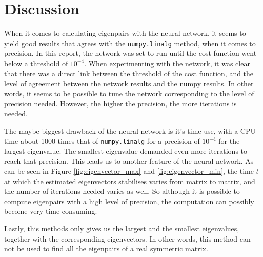 \section{Discussion}
\label{sec:discussion}

When it comes to calculating eigenpairs with the neural network, it seems to yield good results that agrees with the \texttt{numpy.linalg} method, when it comes to precision. In this report, the network was set to run until the cost function went below a threshold of $10^{-4}$. When experimenting with the network, it was clear that there was a direct link between the threshold of the cost function, and the level of agreement between the network results and the numpy results. In other words, it seems to be possible to tune the network corresponding to the level of precision needed. However, the higher the precision, the more iterations is needed. 

The maybe biggest drawback of the neural network is it's time use, with a CPU time about 1000 times that of \texttt{numpy.linalg} for a precision of $10^{-4}$ for the largest eigenvalue. The smallest eigenvalue demanded even more iterations to reach that precision. This leads us to another feature of the neural network. As can be seen in Figure \ref{fig:eigenvector_max} and \ref{fig:eigenvector_min}, the time $t$ at which the estimated eigenvectors stabilises varies from matrix to matrix, and the number of iterations needed varies as well. So although it is possible to compute eigenpairs with a high level of precision, the computation can possibly become very time consuming. 

Lastly, this methods only gives us the largest and the smallest eigenvalues, together with the corresponding eigenvectors. In other words, this method can not be used to find all the eigenpairs of a real symmetric matrix. 